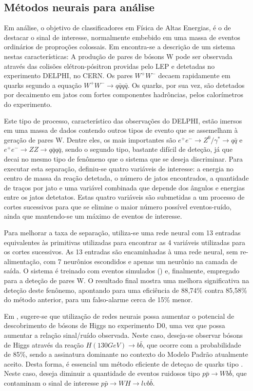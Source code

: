 \subsection{Métodos neurais para análise }

Em análise, o objetivo de classificadores em Física de Altas Energias, é o de
destacar o sinal de interesse, normalmente embebido em uma massa de eventos
ordinários de proproções colossais. Em \cite{becks-acat-2001} encontra-se a
descrição de um sistema nestas características: A produção de pares de bósons
W pode ser observada através das colisões elétron-pósitron providas pelo LEP e
detetadas no experimento DELPHI, no CERN. Os pares $W^+W^-$ decaem rapidamente
em quarks segundo a equação $W^+W^- \rightarrow q\bar{q}q\bar{q}$. Os quarks,
por sua vez, são detetados por decaimento em jatos com fortes componentes
hadrôncias, pelos calorímetros do experimento.

Este tipo de processo, característico das observações do DELPHI, estão imersos
em uma massa de dados contendo outros tipos de evento que se assemelham à
geração de pares W. Dentre eles, os mais importantes são $e^+e^- \rightarrow
Z^0/\gamma^{*} \rightarrow q\bar{q}$ e $e^+e^- \rightarrow ZZ \rightarrow
q\bar{q}q\bar{q}$, sendo o segundo tipo, bastante difícil de deteção, já que
decai no mesmo tipo de fenômeno que o sistema que se deseja discriminar. Para
executar esta separação, definiu-se quatro variáveis de interesse: a energia
no centro de massa da reação detetada, o número de jatos encontrados, a
quantidade de traços por jato e uma variável combinada que depende dos ângulos
e energias entre os jatos detetatos. Estas quatro variáveis são submetidas a
um processo de cortes sucessivos para que se elimine o maior número possível
eventos-ruído, ainda que mantendo-se um máximo de eventos de interesse.

Para melhorar a taxa de separação, utiliza-se uma rede neural com 13 entradas
equivalentes às primitivas utilizadas para encontrar as 4 variáveis utilizadas
para os cortes sucessivos. As 13 entradas são encaminhadas à uma rede neural,
sem re-alimentação, com 7 neurônios escondidos e apenas um neurônio na camada
de saída. O sistema é treinado com eventos simulados () e,
finalmente, empregado para a deteção de pares W. O resultado final mostra uma
melhora significativa na deteção deste fenônemo, apontando para uma eficiência
de 88,74\% contra 85,58\% do método anterior, para um falso-alarme cerca de
15\% menor.

Em \cite{tentindo-acat-2001}, sugere-se que utilização de redes neurais possa
aumentar o potencial de descobrimento de bósons de Higgs no experimento D0,
uma vez que possa aumentar a relação sinal/ruído observada. Neste caso,
deseja-se observar bósons de Higgs através da reação $H(130 GeV) \rightarrow
b\bar{b}$, que ocorre com a probabilidade de 85\%, sendo a assinatura
dominante no contexto do Modelo Padrão atualmente aceito. Desta forma, é
essencial um método eficiente de deteçao de quarks tipo . Neste
caso, deseja diminuir a quantidade de eventos ruidosos tipo $p\bar{p}
\rightarrow Wb\bar{b}$, que contaminam o sinal de interesse $p\bar{p}
\rightarrow WH \rightarrow l \upsilon b\bar{b}$. 


